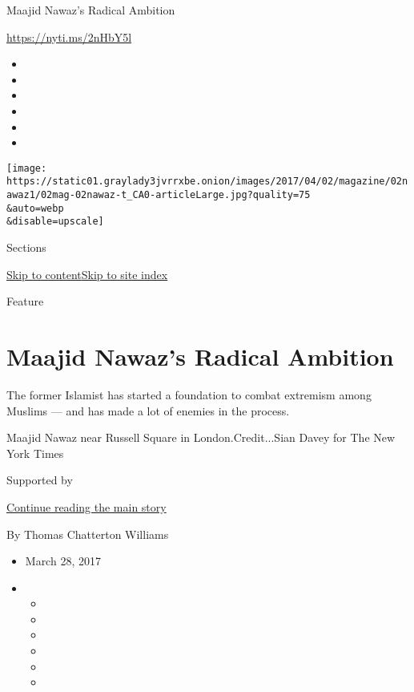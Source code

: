 Maajid Nawaz's Radical Ambition

\url{https://nyti.ms/2nHbY5l}

\begin{itemize}
\item
\item
\item
\item
\item
\item
\end{itemize}

\texttt{[image: https://static01.graylady3jvrrxbe.onion/images/2017/04/02/magazine/02nawaz1/02mag-02nawaz-t\_CA0-articleLarge.jpg?quality=75\\\&auto=webp\\\&disable=upscale]}

Sections

\protect\hyperlink{site-content}{Skip to
content}\protect\hyperlink{site-index}{Skip to site index}

Feature

\hypertarget{maajid-nawazs-radical-ambition}{%
\section{Maajid Nawaz's Radical
Ambition}\label{maajid-nawazs-radical-ambition}}

The former Islamist has started a foundation to combat extremism among
Muslims --- and has made a lot of enemies in the process.

Maajid Nawaz near Russell Square in London.Credit...Sian Davey for The
New York Times

Supported by

\protect\hyperlink{after-sponsor}{Continue reading the main story}

By Thomas Chatterton Williams

\begin{itemize}
\item
  March 28, 2017
\item
  \begin{itemize}
  \item
  \item
  \item
  \item
  \item
  \item
  \end{itemize}
\end{itemize}


